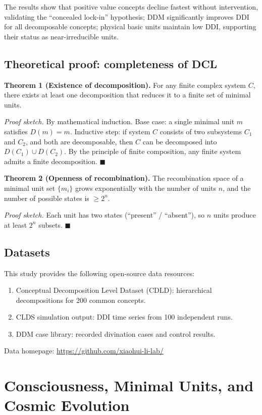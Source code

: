 \documentclass[11pt,a4paper]{article}
\begin{document}
The results show that positive value concepts decline fastest without intervention, validating the ``concealed lock-in'' hypothesis; DDM significantly improves DDI for all decomposable concepts; physical basic units maintain low DDI, supporting their status as near-irreducible units.

\subsection{Theoretical proof: completeness of DCL}

\noindent\textbf{Theorem 1 (Existence of decomposition).} For any finite complex system $C$, there exists at least one decomposition that reduces it to a finite set of minimal units.

\noindent\textit{Proof sketch.} By mathematical induction. Base case: a single minimal unit $m$ satisfies $D(m)=m$. Inductive step: if system $C$ consists of two subsystems $C_1$ and $C_2$, and both are decomposable, then $C$ can be decomposed into $D(C_1) \cup D(C_2)$. By the principle of finite composition, any finite system admits a finite decomposition. $\blacksquare$

\noindent\textbf{Theorem 2 (Openness of recombination).} The recombination space of a minimal unit set $\{m_i\}$ grows exponentially with the number of units $n$, and the number of possible states is $\geq 2^n$.

\noindent\textit{Proof sketch.} Each unit has two states (``present'' / ``absent''), so $n$ units produce at least $2^n$ subsets. $\blacksquare$

\subsection{Datasets}

This study provides the following open-source data resources:
\begin{enumerate}
    \item Conceptual Decomposition Level Dataset (CDLD): hierarchical decompositions for 200 common concepts.
    \item CLDS simulation output: DDI time series from 100 independent runs.
    \item DDM case library: recorded divination cases and control results.
\end{enumerate}
Data homepage: \url{https://github.com/xiaohui-li-lab/}

\section{Consciousness, Minimal Units, and Cosmic Evolution}
\end{document}
